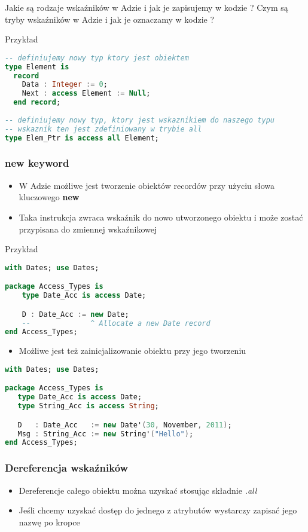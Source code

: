 \documentclass[a4paper,15pt]{article}
\newcommand{\ask}[2]{
    \begin{tcolorbox}[colback=black!5!white,colframe=gray,title={Pytanie #1}]
        #2
    \end{tcolorbox}
}
\begin{document}
\ask{}{
Jakie są rodzaje wskaźników w Adzie i jak je zapisujemy w kodzie ? Czym są tryby wskaźników w Adzie i jak je oznaczamy w kodzie ?
}

Przykład
\begin{lstlisting}[language=Ada, caption=Tworzenie wskaznikow w Adzie]
-- definiujemy nowy typ ktory jest obiektem
type Element is 
  record 
    Data : Integer := 0;
    Next : access Element := Null;
  end record; 
 
-- definiujemy nowy typ, ktory jest wskaznikiem do naszego typu
-- wskaznik ten jest zdefiniowany w trybie all 
type Elem_Ptr is access all Element; 
\end{lstlisting}

\subsubsection{new keyword}

\begin{itemize}
\item W Adzie możliwe jest tworzenie obiektów recordów przy użyciu słowa kluczowego \textbf{new}
\item Taka instrukcja zwraca wskaźnik do nowo utworzonego obiektu i może zostać przypisana do zmiennej wskaźnikowej
\end{itemize}
Przykład
\begin{lstlisting}[language=Ada, caption=Uzycie slowa new]
with Dates; use Dates;

package Access_Types is
    type Date_Acc is access Date;

    D : Date_Acc := new Date;
    --              ^ Allocate a new Date record
end Access_Types;
\end{lstlisting}

\begin{itemize}
\item Możliwe jest też zainicjalizowanie obiektu przy jego tworzeniu
\end{itemize} 
\begin{lstlisting}[language=Ada, caption=Uzycie slowa new]
with Dates; use Dates;

package Access_Types is
   type Date_Acc is access Date;
   type String_Acc is access String;

   D   : Date_Acc   := new Date'(30, November, 2011);
   Msg : String_Acc := new String'("Hello");
end Access_Types;
\end{lstlisting}

\subsubsection{Dereferencja wskaźników}
\begin{itemize}
\item Dereferencje całego obiektu można uzyskać stosując składnie \textit{.all}
\item Jeśli chcemy uzyskać dostęp do jednego z atrybutów wystarczy zapisać jego nazwę po kropce
\end{itemize}
\end{document}
